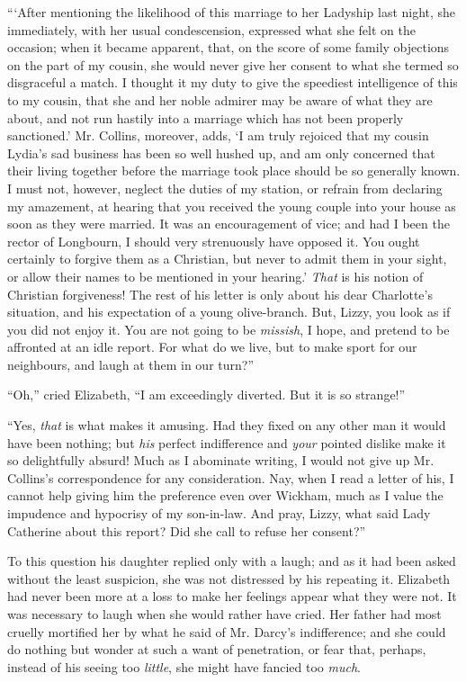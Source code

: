 \documentclass[12pt,openright]{book}
\begin{document}
“‘After mentioning the likelihood of this marriage to her Ladyship last night, she immediately, with her usual condescension, expressed what she felt on the occasion; when it became apparent, that, on the score of some family objections on the part of my cousin, she would never give her consent to what she termed so disgraceful a match. I thought it my duty to give the speediest intelligence of this to my cousin, that she and her noble admirer may be aware of what they are about, and not run hastily into a marriage which has not been properly sanctioned.’ Mr. Collins, moreover, adds, ‘I am truly rejoiced that my cousin Lydia’s sad business has been so well hushed up, and am only concerned that their living together before the marriage took place should be so generally known. I must not, however, neglect the duties of my station, or refrain from declaring my amazement, at hearing that you received the young couple into your house as soon as they were married. It was an encouragement of vice; and had I been the rector of Longbourn, I should very strenuously have opposed it. You ought certainly to forgive them as a Christian, but never to admit them in your sight, or allow their names to be mentioned in your hearing.’ \textit{That} is his notion of Christian forgiveness! The rest of his letter is only about his dear Charlotte’s situation, and his expectation of a young olive-branch. But, Lizzy, you look as if you did not enjoy it. You are not going to be \textit{missish}, I hope, and pretend to be affronted at an idle report. For what do we live, but to make sport for our neighbours, and laugh at them in our turn?”

“Oh,” cried Elizabeth, “I am exceedingly diverted. But it is so strange!”

“Yes, \textit{that} is what makes it amusing. Had they fixed on any other man it would have been nothing; but \textit{his} perfect indifference and \textit{your} pointed dislike make it so delightfully absurd! Much as I abominate writing, I would not give up Mr. Collins’s correspondence for any consideration. Nay, when I read a letter of his, I cannot help giving him the preference even over Wickham, much as I value the impudence and hypocrisy of my son-in-law. And pray, Lizzy, what said Lady Catherine about this report? Did she call to refuse her consent?”

To this question his daughter replied only with a laugh; and as it had been asked without the least suspicion, she was not distressed by his repeating it. Elizabeth had never been more at a loss to make her feelings appear what they were not. It was necessary to laugh when she would rather have cried. Her father had most cruelly mortified her by what he said of Mr. Darcy’s indifference; and she could do nothing but wonder at such a want of penetration, or fear that, perhaps, instead of his seeing too \textit{little}, she might have fancied too \textit{much}.
\end{document}
